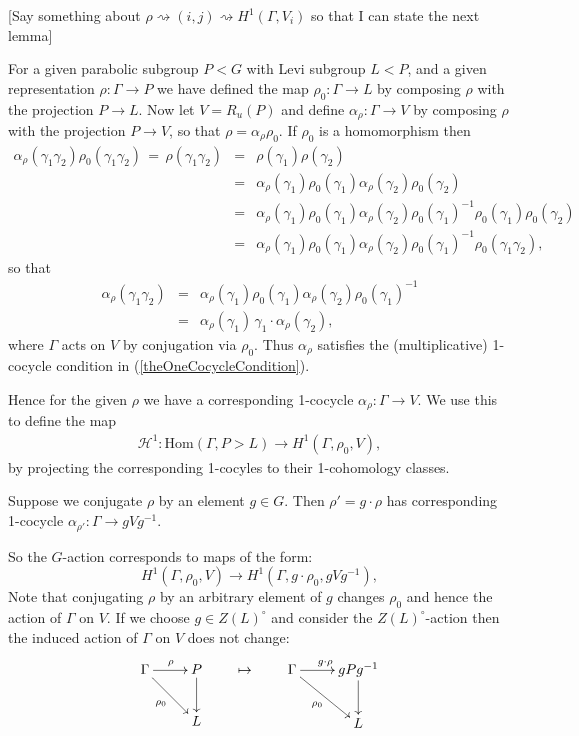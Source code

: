 [Say something about $\rho \rightsquigarrow (i,j) \rightsquigarrow H^1(\Gamma,V_i)$ so that I can state the next lemma]

For a given parabolic subgroup $P<G$ with Levi subgroup $L<P$, and a given representation $\rho:\Gamma\rightarrow P$ we have defined the map $\rho_0:\Gamma\rightarrow L$ by composing $\rho$ with the projection $P\rightarrow L$. Now let $V = R_u(P)$ and define $\alpha_\rho:\Gamma\rightarrow V$ by composing $\rho$ with the projection $P\rightarrow V$, so that $\rho = \alpha_\rho\rho_0$. If $\rho_0$ is a homomorphism then
\begin{eqnarray*}
	\alpha_\rho(\gamma_1\gamma_2)\rho_0(\gamma_1\gamma_2) \,=\, \rho(\gamma_1\gamma_2) 
		&=& \rho(\gamma_1)\rho(\gamma_2) \\
		&=& \alpha_\rho(\gamma_1)\rho_0(\gamma_1)\alpha_\rho(\gamma_2)\rho_0(\gamma_2) \\
		&=& \alpha_\rho(\gamma_1)\rho_0(\gamma_1)\alpha_\rho(\gamma_2)\rho_0(\gamma_1)^{-1}\rho_0(\gamma_1)\rho_0(\gamma_2)\\
		&=&\alpha_\rho(\gamma_1)\rho_0(\gamma_1)\alpha_\rho(\gamma_2)\rho_0(\gamma_1)^{-1}\rho_0(\gamma_1\gamma_2),
\end{eqnarray*}
so that
\begin{eqnarray*}
	\alpha_\rho(\gamma_1\gamma_2) &=&
	\alpha_\rho(\gamma_1)\rho_0(\gamma_1)\alpha_\rho(\gamma_2)\rho_0(\gamma_1)^{-1}\\
	&=& \alpha_\rho(\gamma_1)\,\gamma_1\cdot\alpha_\rho(\gamma_2),
\end{eqnarray*}
where $\Gamma$ acts on $V$ by conjugation via $\rho_0$. Thus $\alpha_\rho$ satisfies the (multiplicative) 1-cocycle condition in (\ref{theOneCocycleCondition}).

Hence for the given $\rho$ we have a corresponding 1-cocycle $\alpha_\rho:\Gamma\rightarrow V$. We use this to define the map
\begin{eqnarray}\label{repToH1}
	\mathcal{H}^1:\mathrm{Hom}(\Gamma, P>L) \rightarrow H^1(\Gamma, \rho_0, V),
\end{eqnarray}
by projecting the corresponding 1-cocyles to their 1-cohomology classes.

Suppose we conjugate $\rho$ by an element $g\in G$. Then $\rho'=g\cdot\rho$ has corresponding 1-cocycle $\alpha_{\rho'}:\Gamma\rightarrow gVg^{-1}$.

So the $G$-action corresponds to maps of the form:
\begin{displaymath}
	H^1(\Gamma, \rho_0, V)\rightarrow H^1(\Gamma, g\cdot\rho_0, gVg^{-1}),
\end{displaymath}
Note that conjugating $\rho$ by an arbitrary element of $g$ changes $\rho_0$ and hence the action of $\Gamma$ on $V$. If we choose $g\in Z(L)^\circ$ and consider the $Z(L)^\circ$-action then the induced action of $\Gamma$ on $V$ does not change:
\begin{displaymath}
	\xymatrix{
		\Gamma \ar[r]^{\rho} \ar[rd]_{\rho_0} & P \ar[d]\\
		& L} \qquad\mapsto\qquad
	\xymatrix{
		\Gamma \ar[r]^{g\cdot\rho} \ar[rd]_{\rho_0} & gPg^{-1} \ar[d]\\
		& L}
\end{displaymath} 


